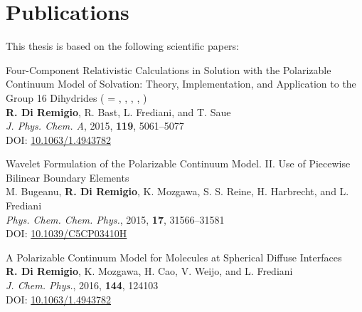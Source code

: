 \thispagestyle{empty}
{}

\chapter*{Publications}

This thesis is based on the following scientific papers:

\renewcommand{\descriptionlabel}[1]{\hspace*{\labelsep}#1}
\begin{description}[leftmargin=2mm, style=nextline]
\item[\paper{I}]
  {\small\textsf{
  Four-Component Relativistic Calculations in Solution with the
  Polarizable Continuum Model of Solvation: Theory,
  Implementation, and Application to the Group 16 Dihydrides
   ( = , , , ,
  )
  }
  \\
  \textbf{R. Di Remigio}, R. Bast, L. Frediani, and T. Saue
  \\
\textit{J. Phys. Chem. A}, \textrm{2015}, \textbf{119}, 5061--5077
  \\
  DOI: \href{http://dx.doi.org/10.1063/1.4943782}{10.1063/1.4943782}
  }
\label{relapcm}

\item[\paper{II}]
  {\small\textsf{
  Wavelet Formulation of the Polarizable Continuum Model. II. Use of
  Piecewise Bilinear Boundary Elements
  }
  \\
  M. Bugeanu, \textbf{R. Di Remigio}, K. Mozgawa, S. S. Reine, H.
  Harbrecht,  and L. Frediani
  \\
  \textit{Phys. Chem. Chem. Phys.}, \textrm{2015}, \textbf{17},
  31566--31581
  \\
  DOI: \href{http://dx.doi.org/10.1039/C5CP03410H}{10.1039/C5CP03410H}
  }
\label{wemlin}

\item[\paper{III}]
  \small{\textsf{
  A Polarizable Continuum Model for Molecules at Spherical
  Diffuse Interfaces
  }
  \\
  \textbf{R. Di Remigio}, K. Mozgawa, H. Cao, V. Weijo, and L.
  Frediani
  \\
  \textit{J. Chem. Phys.}, \textrm{2016}, \textbf{144}, 124103
  \\
  DOI: \href{http://dx.doi.org/10.1063/1.4943782}{10.1063/1.4943782}
  }
\label{spherical}


\end{description}
